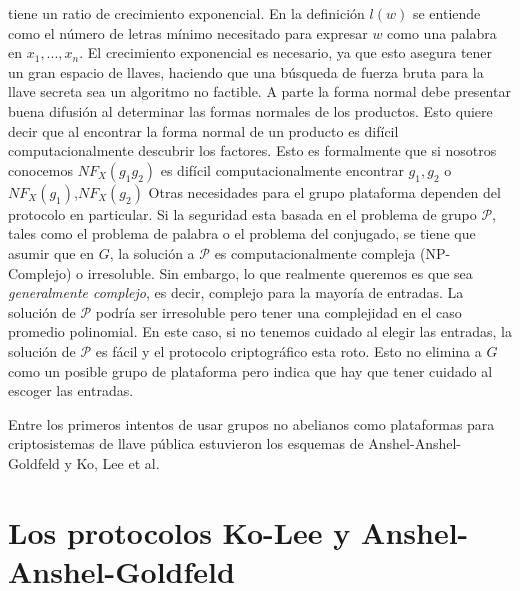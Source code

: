 \documentclass[12pt]{article}
\theoremstyle{definition}
\begin{document}
tiene un ratio de crecimiento exponencial. En la definición $l(w)$ se entiende como el número de letras mínimo necesitado para expresar $w$ como una palabra en $x_1,...,x_n$. El crecimiento exponencial es necesario, ya que esto asegura tener un gran espacio de llaves, haciendo que una búsqueda de fuerza bruta para la llave secreta sea un algoritmo no factible.
\newline
\newline
A parte la forma normal debe presentar buena difusión al determinar las formas normales de los productos. Esto quiere decir que al encontrar la forma normal de un producto es difícil computacionalmente descubrir los factores. Esto es formalmente que si nosotros conocemos $NF_X(g_1g_2)$ es difícil computacionalmente encontrar $g_1,g_2$ o $NF_X(g_1)$,$NF_X(g_2)$
\newline
\newline
Otras necesidades para el grupo plataforma dependen del protocolo en particular. Si la seguridad esta basada en el problema de grupo $\mathcal{P}$, tales como el problema de palabra o el problema del conjugado, se tiene que asumir que en $G$, la solución a $\mathcal{P}$ es computacionalmente compleja (NP-Complejo) o irresoluble. Sin embargo, lo que realmente queremos es que sea \textit{generalmente complejo}, es decir, complejo para la mayoría de entradas. La solución de $\mathcal{P}$ podría ser irresoluble pero tener una complejidad en el caso promedio polinomial. En este caso, si no tenemos cuidado al elegir las entradas, la solución de $\mathcal{P}$ es fácil y el protocolo criptográfico esta roto. Esto no elimina a $G$ como un posible grupo de plataforma pero indica que hay que tener cuidado al escoger las entradas.

Entre los primeros intentos de usar grupos no abelianos como plataformas para criptosistemas de llave pública estuvieron los esquemas de Anshel-Anshel-Goldfeld y Ko, Lee et al. 

\section{Los protocolos Ko-Lee y Anshel-Anshel-Goldfeld}
\end{document}
